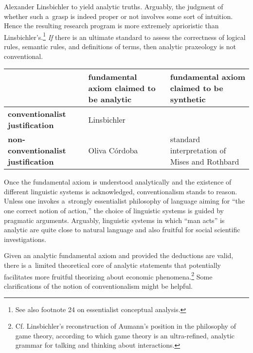 \begin{artengenv}{Alexander Linsbichler}
\parencite[][p.527]{oliva_cordoba_uneasiness_2017} %
 to yield analytic truths. Arguably, the judgment of whether such a~grasp is indeed proper or not involves some sort of intuition. Hence the resulting research program is more extremely aprioristic than Linsbichler's.\footnote{See also footnote 24 on essentialist conceptual analysis.} \textit{If} there is an ultimate standard to assess the correctness of logical rules, semantic rules, and definitions of terms, then analytic praxeology is not conventional.


\begin{table}[h!]
    \centering
    \begin{adjustbox}{max width=\textwidth}
        \begin{tabular}{|>{\centering\arraybackslash}m{4cm}|>{\centering\arraybackslash}m{4cm}|>{\centering\arraybackslash}m{4cm}|}
            \hline
            & \textbf{fundamental axiom claimed to be analytic} & \textbf{fundamental axiom claimed to be synthetic} \\ \hline
            \textbf{conventionalist justification} & Linsbichler & \footnotemark \\ \hline
            \textbf{non-conventionalist justification} & Oliva Córdoba & standard interpretation of Mises and Rothbard \\ \hline
        \end{tabular}
    \end{adjustbox}
\end{table}

Once the fundamental axiom is understood analytically and the existence of different linguistic systems is acknowledged, conventionalism stands to reason. Unless one invokes a~strongly essentialist philosophy of language aiming for ``the one correct notion of action,'' the choice of linguistic systems is guided by pragmatic arguments. Arguably, linguistic systems in which ``man acts'' is analytic are quite close to natural language and also fruitful for social scientific investigations.



Given an analytic fundamental axiom and provided the deductions are valid, there is a~limited theoretical core of analytic statements that potentially facilitates more fruitful theorizing about economic phenomena.\footnote{Cf. Linsbichler's 
\parencite*[][]{linsbichler_ultra-refined_2023} %
 reconstruction of Aumann's position in the philosophy of game theory, according to which game theory is an ultra-refined, analytic grammar for talking and thinking about interactions.} Some clarifications of the notion of conventionalism might be helpful.




\end{artengenv}
